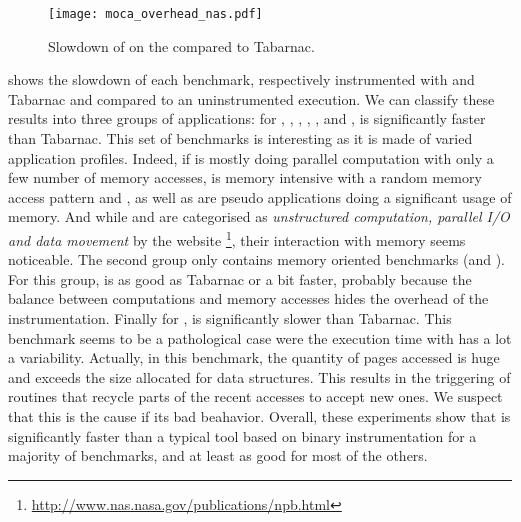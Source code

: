 \begin{figure}[htb]
    \centering
    \texttt{[image: moca\_overhead\_nas.pdf]}
    \caption{Slowdown of \Moca on the \NPB compared to
    Tabarnac.}
    \label{fig:ovh}
\end{figure}

 shows the slowdown of each benchmark, respectively instrumented with \Moca and Tabarnac and compared to
an uninstrumented execution. We can classify these results into three groups of
applications:  for \BT, \DC, \EP, \IS, \LU, \SP and \UA, \Moca is
significantly faster than Tabarnac. This set of benchmarks is interesting as it is made of varied application profiles.
Indeed, if \EP is mostly doing parallel computation with only a few number of
memory accesses, \IS is memory intensive with a random memory access pattern and
\BT, \LU as well as \SP are pseudo applications doing a significant usage of memory.
And while \DC and \UA are categorised as \emph{unstructured computation,
parallel I/O and data movement} by the \NPB website
\footnote{\url{http://www.nas.nasa.gov/publications/npb.html}}, their interaction with memory seems noticeable.
The second group only contains memory oriented benchmarks (\CG and \FT). For this group,
\Moca is as good as Tabarnac or a bit faster, probably because the balance between computations and memory accesses hides the overhead of the instrumentation.
Finally for \MG, \Moca is
significantly slower than Tabarnac. This benchmark seems to be a pathological
case were the execution time with \Moca has a lot a variability. Actually, in this benchmark, the quantity of pages accessed is huge and exceeds the size
allocated for \Moca data structures. This results in the triggering of \Moca routines that recycle parts of the recent accesses to accept new ones.
We suspect that this is the cause if its bad beahavior.
Overall, these experiments show that \Moca is significantly faster than a typical tool based on binary instrumentation
for a majority of benchmarks, and at least as good for most of the others.

